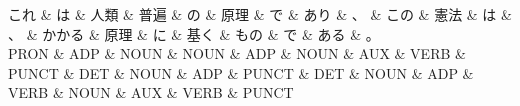 \documentclass[tikz,border=5pt]{standalone}
\begin{document}
\normalsize
\begin{dependency}[edge unit distance=12.0pt]
    \begin{deptext}[column sep=1em]
        これ \& は \& 人類 \& 普遍 \& の \& 原理 \& で \& あり \& 、 \& この \& 憲法 \& は \& 、 \& かかる \& 原理 \& に \& 基く \& もの \& で \& ある \& 。\\
        PRON \& ADP \& NOUN \& NOUN \& ADP \& NOUN \& AUX \& VERB \& PUNCT \& DET \& NOUN \& ADP \& PUNCT \& DET \& NOUN \& ADP \& VERB \& NOUN \& AUX \& VERB \& PUNCT\\
    \end{deptext}
\end{dependency}
\end{document}
